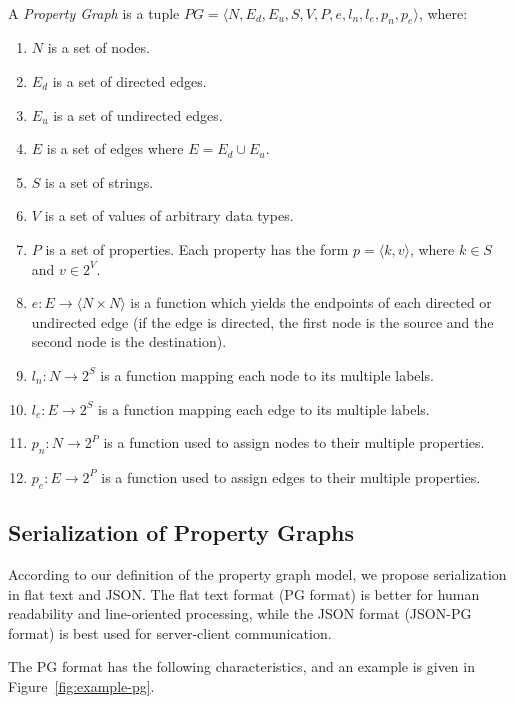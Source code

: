 \documentclass[runningheads]{llncs}
\begin{document}
\begin{defi}
\leavevmode \vspace{1mm} \\
A \emph{Property Graph} is a tuple
$PG = \langle N, E_d, E_u, S, V, P, e, l_n, l_e, p_n, p_e\rangle$, where:
\begin{enumerate}
    \item $N$ is a set of nodes.
    \item $E_d$ is a set of directed edges.
    \item $E_u$ is a set of undirected edges.
    \item $E$ is a set of edges where $E = E_d \cup E_u$.
    \item $S$ is a set of strings.
    \item $V$ is a set of values of arbitrary data types.
    \item $P$ is a set of properties. Each property has the form $p = \langle k,v \rangle$, where $k \in S$ and $v \in 2^V$.
    \item $e: E \to \langle N \times N \rangle$ is a function which yields the endpoints of each directed or undirected edge (if the edge is directed, the first node is the source and the second node is the destination).
    \item $l_n : N \to 2^S$ is a function mapping each node to its multiple labels.
    \item $l_e : E \to 2^S$ is a function mapping each edge to its multiple labels.
    \item $p_n : N \to 2^P$ is a function used to assign nodes to their multiple properties.
    \item $p_e : E \to 2^P$ is a function used to assign edges to their multiple properties.
\end{enumerate}
\end{defi}


\subsection{Serialization of Property Graphs}
According to our definition of the property graph model, we propose serialization in flat text and JSON. The flat text format (PG format) is better for human readability and line-oriented processing, while the JSON format (JSON-PG format) is best used for server-client communication.

The PG format has the following characteristics, and an example is given in Figure~\ref{fig:example-pg}.
\end{document}
